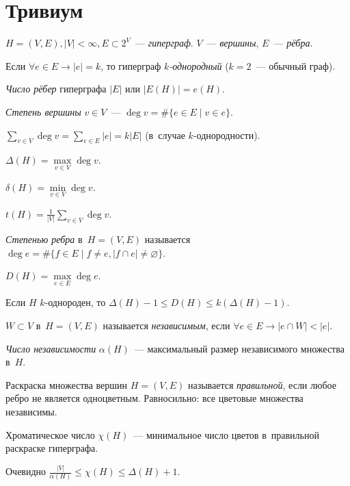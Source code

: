 \documentclass{article}
\begin{document}
\section{Тривиум}

\begin{definition}
	$H = (V, E), |V| < \infty, E \subset 2^V$~--- \emph{гиперграф}.
	$V$~--- \emph{вершины}, $E$~--- \emph{рёбра}.

	Если $\forall e \in E \rightarrow |e| = k$, то гиперграф
	\emph{$k$-однородный} ($k = 2$~--- обычный граф).
\end{definition}
\begin{definition}
	\emph{Число рёбер} гиперграфа $|E|$ или $|E(H)| = e(H)$.

	\emph{Степень вершины} $v \in V$~--- $\deg v = \#\{e \in E \mid v \in e\}$.

	$\sum\limits_{v \in V} \deg v = \sum\limits_{e \in E} |e| = k|E|$ (в~случае
	$k$-однородности).

	$\Delta(H) = \max\limits_{v \in V} \deg v$.

	$\delta(H) = \min\limits_{v \in V} \deg v$.

	$t(H) = \frac{1}{|V|} \sum\limits_{v \in V} \deg v$.
\end{definition}
\begin{definition}
	\emph{Степенью ребра} в~$H = (V, E)$ называется $\deg e = \#\{f \in E \mid f
	\ne e, |f \cap e| \ne \varnothing\}$.

	$D(H) = \max\limits_{e \in E} \deg e$.

	Если $H$ $k$-однороден, то $\Delta(H) - 1 \le D(H) \le k(\Delta(H) - 1)$.
\end{definition}
\begin{definition}
	$W \subset V$ в~$H = (V, E)$ называется \emph{независимым}, если $\forall e
	\in E \rightarrow |e \cap W| < |e|$.

	\emph{Число независимости} $\alpha(H)$~--- максимальный размер независимого
	множества в~$H$.
\end{definition}
\begin{definition}
	Раскраска множества вершин $H = (V, E)$ называется \emph{правильной}, если
	любое ребро не является одноцветным. Равносильно: все цветовые множества
	независимы.

	Хроматическое число $\chi(H)$~--- минимальное число цветов в~правильной
	раскраске гиперграфа.

	Очевидно $\frac{|V|}{\alpha(H)} \le \chi(H) \le \Delta(H) + 1$.
\end{definition}
\end{document}

